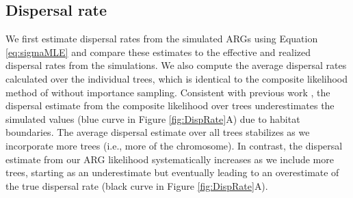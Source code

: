 \subsection{Dispersal rate}
\label{dispersal_rate_section}

We first estimate dispersal rates from the simulated ARGs using Equation \ref{eq:sigmaMLE} and compare these estimates to the effective and realized dispersal rates from the simulations. We also compute the average dispersal rates calculated over the individual trees, which is identical to the composite likelihood method of \citet{osmond2024estimating} without importance sampling. Consistent with previous work \citep[e.g.,][]{kalkauskas2021sampling,Ianni2022}, the dispersal estimate from the composite likelihood over trees underestimates the simulated values (blue curve in Figure \ref{fig:DispRate}A) due to habitat boundaries. The average dispersal estimate over all trees stabilizes as we incorporate more trees (i.e., more of the chromosome). In contrast, the dispersal estimate from our ARG likelihood systematically increases as we include more trees, starting as an underestimate but eventually leading to an overestimate of the true dispersal rate (black curve in Figure \ref{fig:DispRate}A).



